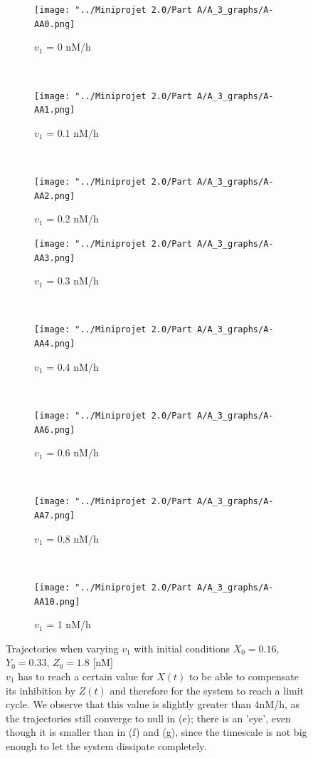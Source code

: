 \documentclass[10pt,a4paper,oneside,twocolumn]{article}
\numberwithin{equation}{section} %
\begin{document}
    \begin{figure}
    \centering
	\begin{subfigure}[b]{0.32\textwidth}
	    \texttt{[image: "../Miniprojet 2.0/Part A/A\_3\_graphs/A-AA0.png]}
	    \caption{$v_1$ = 0 nM/h}
	\end{subfigure}
	~ 
	\begin{subfigure}[b]{0.32\textwidth}
	    \texttt{[image: "../Miniprojet 2.0/Part A/A\_3\_graphs/A-AA1.png]}
	    \caption{$v_1$ = 0.1 nM/h}
	\end{subfigure}
	~ 
	\begin{subfigure}[b]{0.32\textwidth}
	    \texttt{[image: "../Miniprojet 2.0/Part A/A\_3\_graphs/A-AA2.png]}
	    \caption{$v_1$ = 0.2 nM/h}
	\end{subfigure}
	 
	\begin{subfigure}[b]{0.32\textwidth}
	    \texttt{[image: "../Miniprojet 2.0/Part A/A\_3\_graphs/A-AA3.png]}
	    \caption{$v_1$ = 0.3 nM/h}
	\end{subfigure}
	~ 
	\begin{subfigure}[b]{0.32\textwidth}
	    \texttt{[image: "../Miniprojet 2.0/Part A/A\_3\_graphs/A-AA4.png]}
	    \caption{$v_1$ = 0.4 nM/h}
	\end{subfigure}
	~
	\begin{subfigure}[b]{0.32\textwidth}
	    \texttt{[image: "../Miniprojet 2.0/Part A/A\_3\_graphs/A-AA6.png]}
	    \caption{$v_1$ = 0.6 nM/h}
	\end{subfigure}
	~ 
	\begin{subfigure}[b]{0.32\textwidth}
	    \texttt{[image: "../Miniprojet 2.0/Part A/A\_3\_graphs/A-AA7.png]}
	    \caption{$v_1$ = 0.8 nM/h}
	\end{subfigure}
	~
	\begin{subfigure}[b]{0.32\textwidth}
	    \texttt{[image: "../Miniprojet 2.0/Part A/A\_3\_graphs/A-AA10.png]}
	    \caption{$v_1$ = 1 nM/h}
	\end{subfigure}
	
	\caption{Trajectories when varying $v_1$ with initial conditions $X_0 = 0.16$, $Y_0 = 0.33 $, $Z_0 = 1.8$ [nM]\\
	$v_1$ has to reach a certain value for $X(t)$ to be able to compensate its inhibition by $Z(t)$ and therefore for the system to reach a limit cycle. We observe that this value is slightly greater than 4nM/h, as the trajectories still converge to null in (e); there is an 'eye', even though it is smaller than in (f) and (g), since the timescale is not big enough to let the system dissipate completely.
	}
	\label{fig:6}
    \end{figure}
\end{document}
